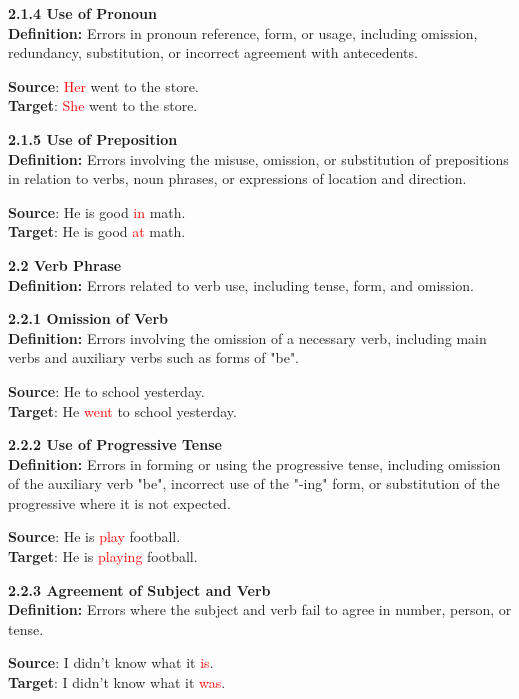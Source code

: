 \begin{tcolorbox}[breakable]
\noindent \textbf{2.1.4 Use of Pronoun}\\
\textbf{Definition:} Errors in pronoun reference, form, or usage, including omission, redundancy, substitution, or incorrect agreement with antecedents.


\textbf{Source}: \textcolor{red}{Her} went to the store. \\
\textbf{Target}: \textcolor{red}{She} went to the store.


\noindent \textbf{2.1.5 Use of Preposition}\\
\textbf{Definition:} Errors involving the misuse, omission, or substitution of prepositions in relation to verbs, noun phrases, or expressions of location and direction.


\textbf{Source}: He is good \textcolor{red}{in} math. \\
\textbf{Target}: He is good \textcolor{red}{at} math.


\noindent \textbf{2.2 Verb Phrase}\\
\textbf{Definition:} Errors related to verb use, including tense, form, and omission.

\noindent \textbf{2.2.1 Omission of Verb}\\
\textbf{Definition:} Errors involving the omission of a necessary verb, including main verbs and auxiliary verbs such as forms of "be".


\textbf{Source}: He to school yesterday. \\
\textbf{Target}: He \textcolor{red}{went} to school yesterday.


\noindent \textbf{2.2.2 Use of Progressive Tense}\\
\textbf{Definition:} Errors in forming or using the progressive tense, including omission of the auxiliary verb "be", incorrect use of the "-ing" form, or substitution of the progressive where it is not expected.


\textbf{Source}: He is \textcolor{red}{play} football. \\
\textbf{Target}: He is \textcolor{red}{playing} football.


\noindent \textbf{2.2.3 Agreement of Subject and Verb}\\
\textbf{Definition:} Errors where the subject and verb fail to agree in number, person, or tense.


\textbf{Source}: I didn't know what it \textcolor{red}{is}. \\
\textbf{Target}: I didn't know what it \textcolor{red}{was}.



\end{tcolorbox}
